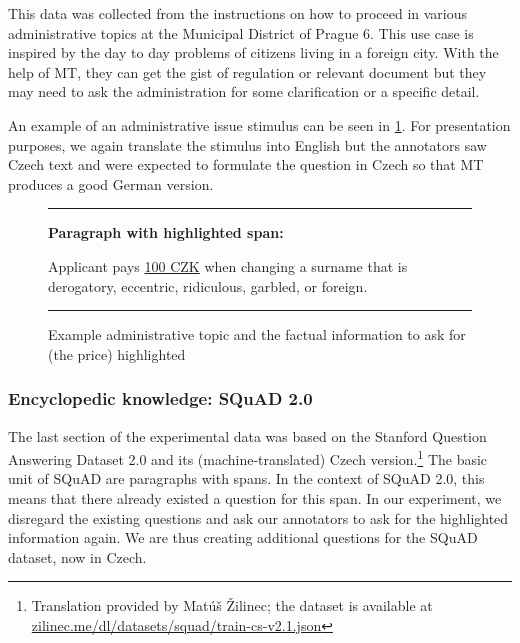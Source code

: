 This data was collected from the instructions on how to proceed in various administrative topics at the Municipal District of Prague 6. This use case is inspired by the day to day problems of citizens living in a foreign city. With the help of MT, they can get the gist of regulation or relevant document but they may need to ask the administration for some clarification or a specific detail.


An example of an administrative issue stimulus can be seen in \cref{fig:admin_example}. For presentation purposes, we again translate the stimulus into English but the annotators saw Czech text and were expected to formulate the question in Czech so that MT produces a good German version.

\begin{figure}[ht]
    \noindent\rule{\linewidth}{0.5pt}
    \textbf{Paragraph with highlighted span:}
    
    Applicant pays {\underline{100 CZK}} when changing a surname that is derogatory, eccentric, ridiculous, garbled, or foreign.
    
    \vspace{-0.2cm}\noindent\rule{\linewidth}{0.5pt}\vspace{-0.2cm}
    \caption{\label{fig:admin_example} Example administrative topic and the
    factual information to ask for (the price) highlighted}
\end{figure}

\subsubsection{Encyclopedic knowledge: SQuAD 2.0}

The last section of the experimental data was based on the Stanford Question Answering Dataset 2.0 \cite{SQUAD-2.0} and its (machine-translated) Czech version.\footnote{Translation provided by Matúš Žilinec; the dataset is available at \href{https://zilinec.me/dl/datasets/squad/train-cs-v2.1.json}{zilinec.me/dl/datasets/squad/train-cs-v2.1.json}} The basic unit of SQuAD are paragraphs with spans. In the context of SQuAD 2.0, this means that there already existed a question for this span. In our experiment, we disregard the existing questions and ask our annotators to ask for the highlighted information again. We are thus creating additional questions for the SQuAD dataset, now in Czech.

